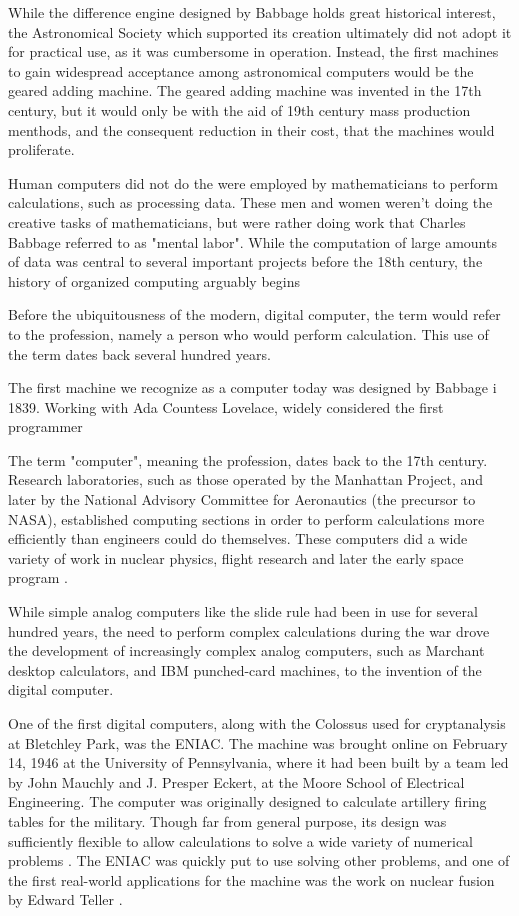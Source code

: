 While the difference engine designed by Babbage holds great historical interest, the Astronomical Society which supported its creation ultimately did not adopt it for
practical use, as it was cumbersome in operation. Instead, the first machines to gain widespread acceptance among astronomical computers would be the geared adding machine. The geared adding machine
was invented in the 17th century, but it would only be with the aid of 19th century mass production menthods, and the consequent reduction in their cost, that the machines would proliferate.

Human computers did not do the were employed by mathematicians to perform calculations, such as processing data. These men and women weren't doing the creative tasks of mathematicians, but
were rather doing work that Charles Babbage referred to as "mental labor"\cite{babbage1832}. While the computation of large amounts of data was central to several important projects before the 18th
century, the history of organized computing arguably begins

Before the ubiquitousness of the modern, digital computer, the term would refer to the profession, namely a person who would perform
calculation. This use of the term dates back several hundred years.

The first machine we recognize as a computer today was designed by Babbage i 1839. Working with Ada Countess Lovelace, widely considered the first programmer

The term "computer", meaning the profession, dates back to the 17th century. Research laboratories, such as those operated by the Manhattan Project, and later by the National Advisory Committee for
Aeronautics (the precursor to NASA), established computing sections in order to perform calculations more efficiently than engineers could do themselves. These computers did a wide variety of work in
nuclear physics, flight research and later the early space program \cite{mclennan2012computer}.

While simple analog computers like the slide rule had been in use for several hundred years, the need to perform complex calculations during the war drove the development of increasingly complex
analog computers, such as Marchant desktop calculators, and IBM punched-card machines\cite{carr}, to the invention of the digital computer.

One of the first digital computers, along with the Colossus used for cryptanalysis at Bletchley Park\cite{sep-computing-history}, was the ENIAC. The machine was brought online on February 14, 1946
at the University of Pennsylvania, where it had been built by a team led by John Mauchly and J. Presper Eckert, at the Moore School of Electrical Engineering. The computer was originally designed to
calculate artillery firing tables for the military. Though far from general purpose, its design was sufficiently flexible to allow calculations to solve a wide variety of numerical problems
\cite{10.2307/2002620}. The ENIAC was quickly put to use solving other problems, and one of the first real-world applications for the machine was the work on nuclear fusion by Edward Teller
\cite{AtomicHeritageFoundation}.

